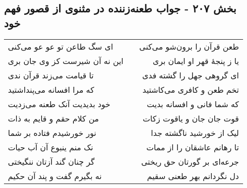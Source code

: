 \begin{center}
\section*{بخش ۲۰۷ - جواب طعنه‌زننده در مثنوی از قصور فهم خود}
\label{sec:sh207}
\begin{longtable}{l p{0.5cm} r}
ای سگ طاعن تو عو عو می‌کنی
&&
طعن قرآن را برون‌شو می‌کنی
\\
این نه آن شیرست کز وی جان بری
&&
یا ز پنجهٔ قهر او ایمان بری
\\
تا قیامت می‌زند قرآن ندی
&&
ای گروهی جهل را گشته فدی
\\
که مرا افسانه می‌پنداشتید
&&
تخم طعن و کافری می‌کاشتید
\\
خود بدیدیت آنک طعنه می‌زدیت
&&
که شما فانی و افسانه بدیت
\\
من کلام حقم و قایم به ذات
&&
قوت جان جان و یاقوت زکات
\\
نور خورشیدم فتاده بر شما
&&
لیک از خورشید ناگشته جدا
\\
نک منم ینبوع آن آب حیات
&&
تا رهانم عاشقان را از ممات
\\
گر چنان گند آزتان ننگیختی
&&
جرعه‌ای بر گورتان حق ریختی
\\
نه بگیرم گفت و پند آن حکیم
&&
دل نگردانم بهر طعنی سقیم
\\
\end{longtable}
\end{center}
